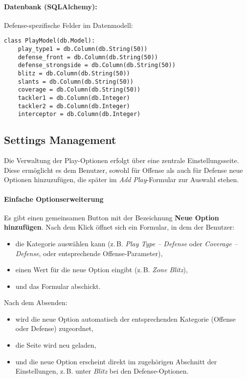 \paragraph{Datenbank (SQLAlchemy):} Defense-spezifische Felder im Datenmodell:

\begin{verbatim}
class PlayModel(db.Model):
    play_type1 = db.Column(db.String(50))
    defense_front = db.Column(db.String(50))
    defense_strongside = db.Column(db.String(50))
    blitz = db.Column(db.String(50))
    slants = db.Column(db.String(50))
    coverage = db.Column(db.String(50))
    tackler1 = db.Column(db.Integer)
    tackler2 = db.Column(db.Integer)
    interceptor = db.Column(db.Integer)
\end{verbatim}

\subsection{ Settings Management}

Die Verwaltung der Play-Optionen erfolgt über eine zentrale Einstellungsseite. Diese ermöglicht es dem Benutzer, sowohl für Offense als auch für Defense neue Optionen hinzuzufügen, die später im \textit{Add Play}-Formular zur Auswahl stehen.

\paragraph{Einfache Optionserweiterung}%
Es gibt einen gemeinsamen Button mit der Bezeichnung \textbf{Neue Option hinzufügen}. Nach dem Klick öffnet sich ein Formular, in dem der Benutzer:
\begin{itemize}
  \item die Kategorie auswählen kann (z.\,B. \textit{Play Type – Defense} oder \textit{Coverage – Defense}, oder entsprechende Offense-Parameter),
  \item einen Wert für die neue Option eingibt (z.\,B. \textit{Zone Blitz}),
  \item und das Formular abschickt.
\end{itemize}

Nach dem Absenden:
\begin{itemize}
  \item wird die neue Option automatisch der entsprechenden Kategorie (Offense oder Defense) zugeordnet,
  \item die Seite wird neu geladen,
  \item und die neue Option erscheint direkt im zugehörigen Abschnitt der Einstellungen, z.\,B. unter \textit{Blitz} bei den Defense-Optionen.
\end{itemize}

